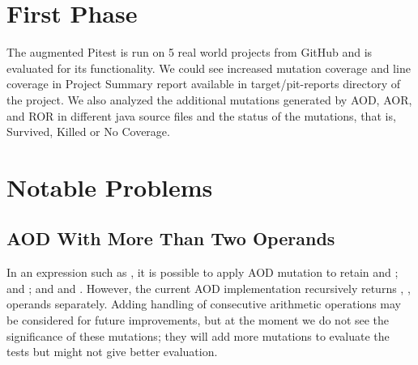 \section{First Phase}





The augmented Pitest is run on 5 real world projects from GitHub and is evaluated for its functionality.
We could see increased mutation coverage and line coverage in Project Summary report available in target/pit-reports directory of the project.
We also analyzed the additional mutations generated by AOD, AOR, and ROR in different java source files and the status of the mutations, that is, Survived, Killed or No Coverage.

\section{Notable Problems}
\subsection{AOD With More Than Two Operands}
In an expression such as , it is possible to apply AOD mutation to retain  and ;  and ; and  and .
However, the current AOD implementation recursively returns , ,  operands separately.
Adding handling of consecutive arithmetic operations may be considered for future improvements, but at the moment we do not see the significance of these mutations;
they will add more mutations to evaluate the tests but might not give better evaluation.

